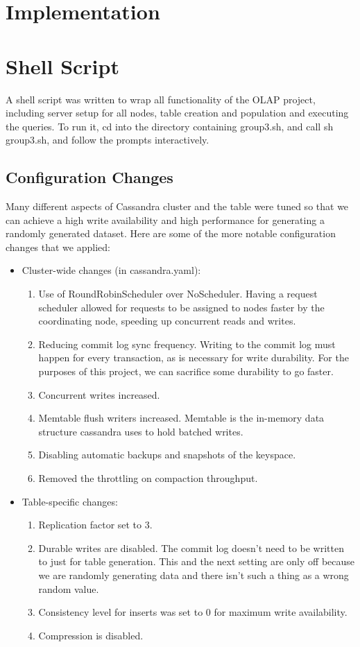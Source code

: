 \documentclass[letterpaper]{article}
\begin{document}
\section{Implementation}

\section{Shell Script}
A shell script was written to wrap all functionality of the OLAP project,
including server setup for all nodes, table creation and population and
executing the queries. To run it, cd into the directory containing group3.sh,
and call sh group3.sh, and follow the prompts interactively.

\subsection{Configuration Changes}
Many different aspects of Cassandra cluster and the table were tuned so that we
can achieve a high write availability and high performance for generating
a randomly generated dataset. Here are some of the more notable configuration
changes that we applied:
\begin{itemize}
	\item Cluster-wide changes (in cassandra.yaml):
		\begin{enumerate}
			\item Use of RoundRobinScheduler over NoScheduler.
				Having a request scheduler allowed for requests
				to be assigned to nodes faster by the
				coordinating node, speeding up
				concurrent reads and writes.
			\item Reducing commit log sync frequency. Writing to
				the commit log must happen for every
				transaction, as is necessary for write
				durability. For the purposes of this project,
				we can sacrifice some durability to go faster.
			\item Concurrent writes increased.
			\item Memtable flush writers increased. Memtable is the
				in-memory data structure cassandra uses to hold
				batched writes.
			\item Disabling automatic backups and snapshots of the
				keyspace. 
			\item Removed the throttling on compaction throughput.

		\end{enumerate}
	\item Table-specific changes:
		\begin{enumerate}
			\item Replication factor set to 3.
			\item Durable writes are disabled. The commit log
				doesn't need to be written to just for table
				generation. This and the next setting are only
				off because we are randomly generating data and
				there isn't such a thing as a wrong random
				value.
			\item Consistency level for inserts was set to 0 for
				maximum write availability.
			\item Compression is disabled.
		\end{enumerate}
\end{itemize}
\end{document}
